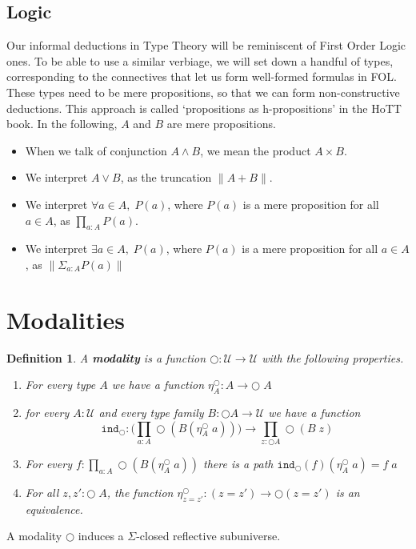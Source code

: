 \documentclass[12pt]{article}
\newtheorem{defn}[thm]{Definition}
\begin{document}
\subsection{Logic}
Our informal deductions in Type Theory will be reminiscent of First Order Logic ones. 
To be able to use a similar verbiage, we will set down a handful of types, corresponding to the connectives that let us form well-formed formulas in FOL. 
These types need to be mere propositions, so that we can form non-constructive deductions. 
This approach is called `propositions as h-propositions' in the HoTT book. 
In the following, $A$ and $B$ are mere propositions.
\begin{itemize}
\item When we talk of conjunction $A \wedge B$, we mean the product $A \times B$. 
\item We interpret $A \vee B$, as the truncation $\| A + B\|$.
\item We interpret $\forall a\in A,\; P(a)$, where $P(a)$ is a mere proposition for all $a \in A$, as $\prod_{a : A}P(a)$. 
\item We interpret $ \exists a \in A,\; P(a)$, where $P(a)$ is a mere proposition for all $a \in A$, as $\| \Sigma_{a : A} P(a) \|$
\end{itemize}

\section{Modalities}
\begin{defn}
A \textbf{modality} is a function $\bigcirc : \mathcal{U} \rightarrow \mathcal{U}$ with the following properties.
\begin{enumerate}
	\item For every type $A$ we have a function $\eta_A^\bigcirc : A \rightarrow \bigcirc\; A$
	\item for every $A : \mathcal{U}$ and every type family $B : \bigcirc A \rightarrow \mathcal{U}$ we have a function
	$$\mathtt{ind}_\bigcirc : \Big( \prod_{a : A}\bigcirc (B (\eta_A^\bigcirc\; a)) \Big) \rightarrow \prod_{z : \bigcirc A} \bigcirc (B\; z)$$
	\item For every $f : \prod_{a : A} \bigcirc (B(\eta_A^\bigcirc\; a))$ there is a path $\mathtt{ind}_\bigcirc (f)(\eta_A^\bigcirc\; a) = f\; a$
	\item For all $z,z' : \bigcirc \; A$, the function $\eta_{z=z'}^\bigcirc : (z = z') \rightarrow \bigcirc (z = z')$ is an equivalence.

\end{enumerate}
\end{defn}
A modality $\bigcirc$ induces a $\Sigma$-closed reflective subuniverse.
\end{document}
